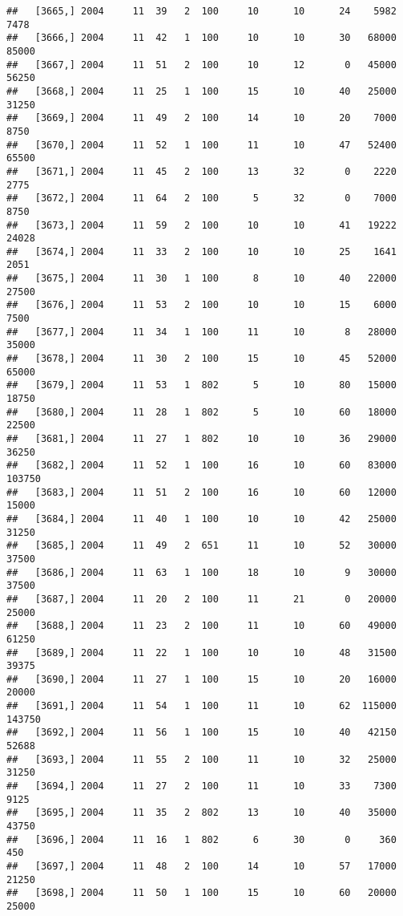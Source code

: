 \documentclass{article}\usepackage[]{graphicx}\usepackage[]{color}
\makeatletter
\newenvironment{kframe}{%
 \def\at@end@of@kframe{}%
 \ifinner\ifhmode%
  \def\at@end@of@kframe{\end{minipage}}%
  \begin{minipage}{\columnwidth}%
 \fi\fi%
 \def\FrameCommand##1{\hskip\@totalleftmargin \hskip-\fboxsep
 \colorbox{shadecolor}{##1}\hskip-\fboxsep
     \hskip-\linewidth \hskip-\@totalleftmargin \hskip\columnwidth}%
 \MakeFramed {\advance\hsize-\width
   \@totalleftmargin\z@ \linewidth\hsize
   \@setminipage}}%
 {\par\unskip\endMakeFramed%
 \at@end@of@kframe}
\newenvironment{knitrout}{}{} %
\makeatother
\begin{document}
\begin{knitrout}
\begin{kframe}
\begin{verbatim}
##   [3665,] 2004     11  39   2  100     10      10      24    5982    7478
##   [3666,] 2004     11  42   1  100     10      10      30   68000   85000
##   [3667,] 2004     11  51   2  100     10      12       0   45000   56250
##   [3668,] 2004     11  25   1  100     15      10      40   25000   31250
##   [3669,] 2004     11  49   2  100     14      10      20    7000    8750
##   [3670,] 2004     11  52   1  100     11      10      47   52400   65500
##   [3671,] 2004     11  45   2  100     13      32       0    2220    2775
##   [3672,] 2004     11  64   2  100      5      32       0    7000    8750
##   [3673,] 2004     11  59   2  100     10      10      41   19222   24028
##   [3674,] 2004     11  33   2  100     10      10      25    1641    2051
##   [3675,] 2004     11  30   1  100      8      10      40   22000   27500
##   [3676,] 2004     11  53   2  100     10      10      15    6000    7500
##   [3677,] 2004     11  34   1  100     11      10       8   28000   35000
##   [3678,] 2004     11  30   2  100     15      10      45   52000   65000
##   [3679,] 2004     11  53   1  802      5      10      80   15000   18750
##   [3680,] 2004     11  28   1  802      5      10      60   18000   22500
##   [3681,] 2004     11  27   1  802     10      10      36   29000   36250
##   [3682,] 2004     11  52   1  100     16      10      60   83000  103750
##   [3683,] 2004     11  51   2  100     16      10      60   12000   15000
##   [3684,] 2004     11  40   1  100     10      10      42   25000   31250
##   [3685,] 2004     11  49   2  651     11      10      52   30000   37500
##   [3686,] 2004     11  63   1  100     18      10       9   30000   37500
##   [3687,] 2004     11  20   2  100     11      21       0   20000   25000
##   [3688,] 2004     11  23   2  100     11      10      60   49000   61250
##   [3689,] 2004     11  22   1  100     10      10      48   31500   39375
##   [3690,] 2004     11  27   1  100     15      10      20   16000   20000
##   [3691,] 2004     11  54   1  100     11      10      62  115000  143750
##   [3692,] 2004     11  56   1  100     15      10      40   42150   52688
##   [3693,] 2004     11  55   2  100     11      10      32   25000   31250
##   [3694,] 2004     11  27   2  100     11      10      33    7300    9125
##   [3695,] 2004     11  35   2  802     13      10      40   35000   43750
##   [3696,] 2004     11  16   1  802      6      30       0     360     450
##   [3697,] 2004     11  48   2  100     14      10      57   17000   21250
##   [3698,] 2004     11  50   1  100     15      10      60   20000   25000

\end{verbatim}
\end{kframe}
\end{knitrout}
\end{document}
